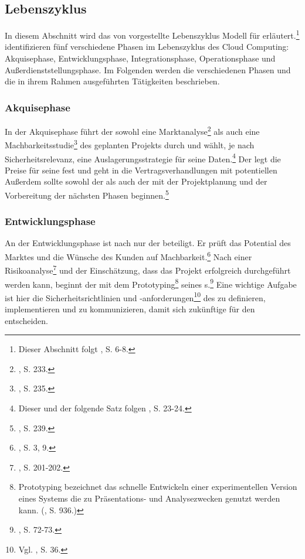 \subsection{Lebenszyklus}
\label{sec:Lebenszyklus}
In diesem Abschnitt wird das von \cite{Schneider.2013} vorgestellte Lebenszyklus Modell für \CSs erläutert.\footnote{Dieser Abschnitt folgt \cite{Schneider.2013}, S. 6-8.}
\cite{Schneider.2013} identifizieren fünf verschiedene Phasen im Lebenszyklus des Cloud Computing: Akquisephase, Entwicklungsphase, Integrationsphase, Operationsphase und Außerdienststellungsphase.
Im Folgenden werden die verschiedenen Phasen und die in ihrem Rahmen ausgeführten Tätigkeiten beschrieben.

\subsubsection{Akquisephase}
In der Akquisephase führt der \CSU sowohl eine Marktanalyse\footnote{\cite{Cullen.2005}, S. 233.} 
als auch eine Machbarkeitsstudie\footnote{\cite{Cullen.2005}, S. 235.} des geplanten \CC Projekts durch und wählt, je nach Sicherheitsrelevanz, eine Auslagerungsstrategie für seine Daten.\footnote{Dieser und der folgende Satz folgen \cite{Lindner.2011}, S. 23-24.}
Der \CSP legt die Preise für seine \CSs fest und geht in die Vertragsverhandlungen mit potentiellen \CSUnDot Außerdem sollte sowohl der \CSP als auch der \CSU mit der Projektplanung und der Vorbereitung der nächsten Phasen beginnen.\footnote{\cite{Cullen.2005}, S. 239.}

\subsubsection{Entwicklungsphase}
An der Entwicklungsphase ist nach \cite{Schneider.2013} nur der \CSP beteiligt. Er prüft das Potential des Marktes und die Wünsche des Kunden auf Machbarkeit.\footnote{\cite{Jin.2008}, S. 3, 9.}\saveFN{\Jin}  Nach einer Risikoanalyse\footnote{\cite{Taylor.2007}, S. 201-202.} und der Einschätzung, dass das \CC Projekt erfolgreich\useFN{\Jin} durchgeführt werden kann, beginnt der \CSP mit dem Prototyping\footnote{Prototyping bezeichnet das schnelle Entwickeln einer experimentellen Version eines Systems die zu Präsentations- und Analysezwecken genutzt werden kann. (\cite{Laudon.2010}, S. 936.)}
seines \Cs s.\footnote{\cite{Sommerville.2012}, S. 72-73.}
Eine wichtige Aufgabe ist hier die Sicherheitsrichtlinien und -anforderungen\footnote{Vgl. \cite{Taylor.2007}, S. 36.} des \CSs zu definieren, implementieren und zu kommunizieren, damit sich zukünftige \CSU für den \CS entscheiden.

